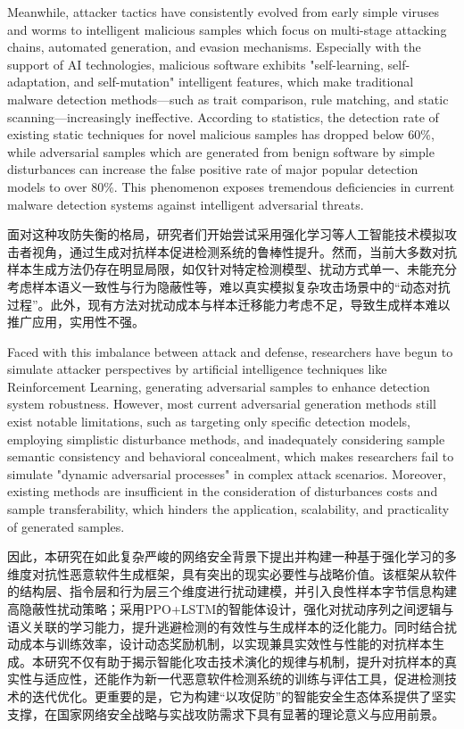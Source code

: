 Meanwhile, attacker tactics have consistently evolved from early simple viruses and worms to intelligent malicious samples which focus on multi-stage attacking chains, automated generation, and evasion mechanisms. Especially with the support of AI technologies, malicious software exhibits "self-learning, self-adaptation, and self-mutation" intelligent features, which make traditional malware detection methods—such as trait comparison, rule matching, and static scanning—increasingly ineffective\cite{chen2018study, ren2021matching, lipp2022empirical}. According to statistics, the detection rate of existing static techniques for novel malicious samples has dropped below 60\%, while adversarial samples which are generated from benign software by simple disturbances can increase the false positive rate of major popular detection models to over 80\%. This phenomenon exposes tremendous deficiencies in current malware detection systems against intelligent adversarial threats.

面对这种攻防失衡的格局，研究者们开始尝试采用强化学习等人工智能技术模拟攻击者视角，通过生成对抗样本促进检测系统的鲁棒性提升。然而，当前大多数对抗样本生成方法仍存在明显局限，如仅针对特定检测模型、扰动方式单一、未能充分考虑样本语义一致性与行为隐蔽性等，难以真实模拟复杂攻击场景中的“动态对抗过程”\cite{yu2022natural, ilahi2021challenges, labaca2021aimed,standen2025adversarial}。此外，现有方法对扰动成本与样本迁移能力考虑不足，导致生成样本难以推广应用，实用性不强。

Faced with this imbalance between attack and defense, researchers have begun to simulate attacker perspectives by artificial intelligence techniques like Reinforcement Learning, generating adversarial samples to enhance detection system robustness. However, most current adversarial generation methods still exist notable limitations, such as targeting only specific detection models, employing simplistic disturbance methods, and inadequately considering sample semantic consistency and behavioral concealment, which makes researchers fail to simulate "dynamic adversarial processes" in complex attack scenarios\cite{yu2022natural, ilahi2021challenges, labaca2021aimed,standen2025adversarial}. Moreover, existing methods are insufficient in the consideration of disturbances costs and sample transferability, which hinders the application, scalability, and practicality of generated samples.

因此，本研究在如此复杂严峻的网络安全背景下提出并构建一种基于强化学习的多维度对抗性恶意软件生成框架，具有突出的现实必要性与战略价值。该框架从软件的结构层、指令层和行为层三个维度进行扰动建模，并引入良性样本字节信息构建高隐蔽性扰动策略；采用PPO+LSTM的智能体设计，强化对扰动序列之间逻辑与语义关联的学习能力，提升逃避检测的有效性与生成样本的泛化能力。同时结合扰动成本与训练效率，设计动态奖励机制，以实现兼具实效性与性能的对抗样本生成。本研究不仅有助于揭示智能化攻击技术演化的规律与机制，提升对抗样本的真实性与适应性，还能作为新一代恶意软件检测系统的训练与评估工具，促进检测技术的迭代优化。更重要的是，它为构建“以攻促防”的智能安全生态体系提供了坚实支撑，在国家网络安全战略与实战攻防需求下具有显著的理论意义与应用前景。

